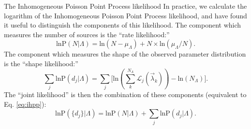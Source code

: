 \documentclass[twocolumn]{aastex631}
\newcommand*{\pprob}{\mathrm{P}}
\newcommand*{\gwL}{\mathcal{L}}
\newcommand*{\BinaryParameters}{\vec{\lambda}}
\newcommand*{\FormationParameters}{\Lambda}
\newcommand*{\gwdetj}{d_j}
\newcommand*{\gwdets}{\{\gwdetj\}}
\begin{document}
\begin{subsection}{The Inhomogeneous Poisson Point Process likelihood}
In practice, we calculate the logarithm of the Inhomogeneous
    Poisson Point Process likelihood,
    and have found it useful to distinguish the components of this likelihood.
The component
    which measures the number of sources is the ``rate likelihood:''
\begin{equation}\label{eq:rate-likelihood}
\mathrm{ln}\pprob(N | \FormationParameters)
    = 
    \mathrm{ln}(N - \mu_{\FormationParameters}) + 
    N \times \mathrm{ln}(\mu_{\FormationParameters}/N).
\end{equation}
The component which measures the shape of the observed
    parameter distribution is the ``shape likelihood:''
\begin{equation}\label{eq:shape-likelihood}
\sum_j \mathrm{ln} \pprob(\gwdetj | \FormationParameters) =
    \sum_j \Big[
    \mathrm{ln}(
    \sum_k^{N_{\FormationParameters}} 
    \gwL_j(\BinaryParameters_k)
    )
    - \mathrm{ln}(N_{\FormationParameters})
    \Big].
\end{equation}
The ``joint likelihood'' is then the combination of these components
    (equivalent to Eq. \ref{eq:ihpp}):
\begin{equation}\label{eq:joint-likelihood}
    \mathrm{ln} \pprob(\gwdets|\FormationParameters) =
\mathrm{ln}\pprob(N | \FormationParameters) +
    \sum_j \mathrm{ln} \pprob(\gwdetj | \FormationParameters).
\end{equation}

\end{subsection}
\end{document}
